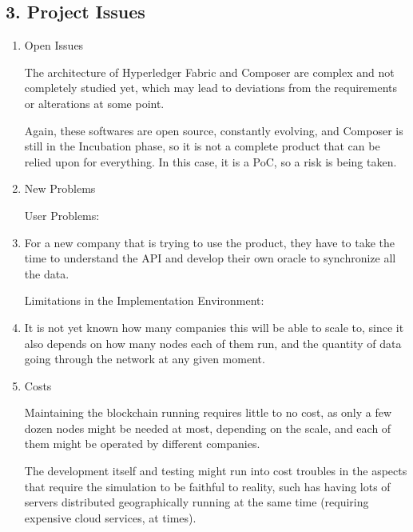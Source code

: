 \subsection*{3. Project Issues}
\begin{enumerate}
	\item Open Issues
		\par The architecture of Hyperledger Fabric and Composer are complex and not completely studied yet, which may lead to deviations from the requirements or alterations at some point.
		\par Again, these softwares are open source, constantly evolving, and Composer is still in the Incubation phase, so it is not a complete product that can be relied upon for everything. In this case, it is a PoC, so a risk is being taken.
	
    \item New Problems
		\par User Problems: 
			\item For a new company that is trying to use the product, they have to take the time to understand the API and develop their own oracle to synchronize all the data. 
		\par Limitations in the Implementation Environment:
			\item It is not yet known how many companies this will be able to scale to, since it also depends on how many nodes each of them run, and the quantity of data going through the network at any given moment.
		
    \item Costs
		\par Maintaining the blockchain running requires little to no cost, as only a few dozen nodes might be needed at most, depending on the scale, and each of them might be operated by different companies.
		\par The development itself and testing might run into cost troubles in the aspects that require the simulation to be faithful to reality, such has having lots of servers distributed geographically running at the same time (requiring expensive cloud services, at times).

\end{enumerate}